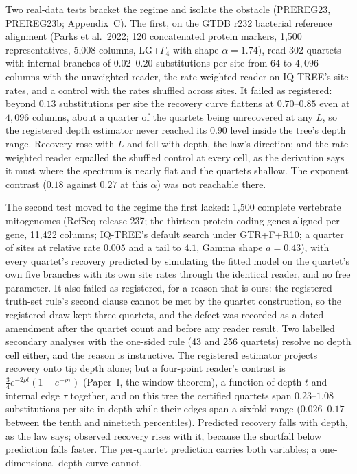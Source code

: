 \documentclass[11pt]{article}
\begin{document}
Two real-data tests bracket the regime and isolate the obstacle (PREREG23, PREREG23b; Appendix~C). The first, on the GTDB r232 bacterial reference alignment (Parks et al.\ 2022; 120 concatenated protein markers, 1,500 representatives, 5,008 columns, LG+$\Gamma_4$ with shape $\alpha=1.74$), read 302 quartets with internal branches of $0.02$--$0.20$ substitutions per site from $64$ to $4{,}096$ columns with the unweighted reader, the rate-weighted reader on IQ-TREE's site rates, and a control with the rates shuffled across sites. It failed as registered: beyond $0.13$ substitutions per site the recovery curve flattens at $0.70$--$0.85$ even at $4{,}096$ columns, about a quarter of the quartets being unrecovered at any $L$, so the registered depth estimator never reached its $0.90$ level inside the tree's depth range. Recovery rose with $L$ and fell with depth, the law's direction; and the rate-weighted reader equalled the shuffled control at every cell, as the derivation says it must where the spectrum is nearly flat and the quartets shallow. The exponent contrast ($0.18$ against $0.27$ at this $\alpha$) was not reachable there.

The second test moved to the regime the first lacked: 1,500 complete vertebrate mitogenomes (RefSeq release 237; the thirteen protein-coding genes aligned per gene, 11,422 columns; IQ-TREE's default search under GTR+F+R10; a quarter of sites at relative rate $0.005$ and a tail to $4.1$, Gamma shape $a=0.43$), with every quartet's recovery predicted by simulating the fitted model on the quartet's own five branches with its own site rates through the identical reader, and no free parameter. It also failed as registered, for a reason that is ours: the registered truth-set rule's second clause cannot be met by the quartet construction, so the registered draw kept three quartets, and the defect was recorded as a dated amendment after the quartet count and before any reader result. Two labelled secondary analyses with the one-sided rule (43 and 256 quartets) resolve no depth cell either, and the reason is instructive. The registered estimator projects recovery onto tip depth alone; but a four-point reader's contrast is $\tfrac34e^{-2\rho t}(1-e^{-\rho\tau})$ (Paper~I, the window theorem), a function of depth $t$ and internal edge $\tau$ together, and on this tree the certified quartets span $0.23$--$1.08$ substitutions per site in depth while their edges span a sixfold range ($0.026$--$0.17$ between the tenth and ninetieth percentiles). Predicted recovery falls with depth, as the law says; observed recovery rises with it, because the shortfall below prediction falls faster. The per-quartet prediction carries both variables; a one-dimensional depth curve cannot.
\end{document}
